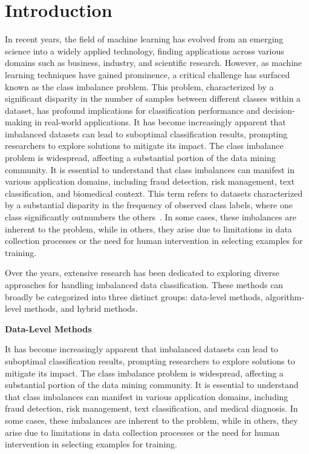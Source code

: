 \section{Introduction}

In recent years, the field of machine learning has evolved from an emerging science into a widely applied technology, finding applications across various domains such as business, industry, and scientific research. However, as machine learning techniques have gained prominence, a critical challenge has surfaced known as the class imbalance problem. This problem, characterized by a significant disparity in the number of samples between different classes within a dataset, has profound implications for classification performance and decision-making in real-world applications.
It has become increasingly apparent that imbalanced datasets can lead to suboptimal classification results, prompting researchers to explore solutions to mitigate its impact. The class imbalance problem is widespread, affecting a substantial portion of the data mining community. It is essential to understand that class imbalances can manifest in various application domains, including fraud detection, risk management, text classification, and biomedical context. This term refers to datasets characterized by a substantial disparity in the frequency of observed class labels, where one class significantly outnumbers the others~\cite{OBrien2019,Tarawneh2020}. In some cases, these imbalances are inherent to the problem, while in others, they arise due to limitations in data collection processes or the need for human intervention in selecting examples for training.
 
Over the years, extensive research has been dedicated to exploring diverse approaches for handling imbalanced data classification. These methods can broadly be categorized into three distinct groups: data-level methods, algorithm-level methods, and hybrid methods. 


\textbf{Data-Level Methods} 

It has become increasingly apparent that imbalanced datasets can lead to suboptimal classification results, prompting researchers to explore solutions to mitigate its impact. 
The class imbalance problem is widespread, affecting a substantial portion of the data mining community.
It is essential to understand that class imbalances can manifest in various application domains, including fraud detection, risk management, text classification, and medical diagnosis. In some cases, these imbalances are inherent to the problem, while in others, they arise due to limitations in data collection processes or the need for human intervention in selecting examples for training.

